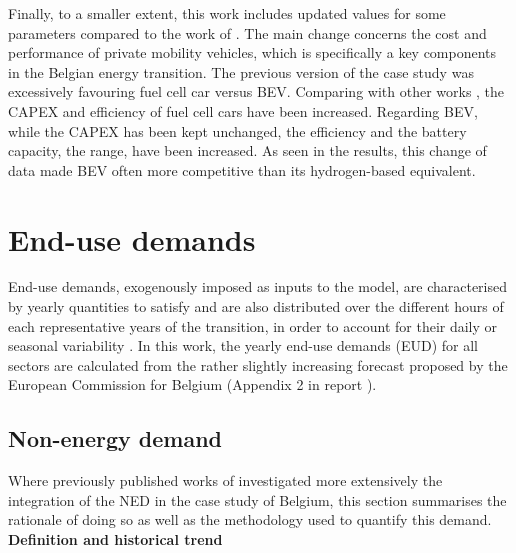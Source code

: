 Finally, to a smaller extent, this work includes updated values for some parameters compared to the work of \citet{limpens2021generating}. The main change concerns the cost and performance of private mobility vehicles, which is specifically a key components in the Belgian energy transition. The previous version of the case study was excessively favouring fuel cell car versus \gls{BEV}. Comparing with other works \cite{schnidrig2021modelling, EuropeanCommission2021}, the CAPEX and efficiency of fuel cell cars have been increased. Regarding \gls{BEV}, while the CAPEX has been kept unchanged, the efficiency and the battery capacity, \ie the range, have been increased. As seen in the results, this change of data made \gls{BEV} often more competitive than its hydrogen-based equivalent. 

\section{End-use demands}
\label{sec:cs:demand}
End-use demands, exogenously imposed as inputs to the model, are characterised by yearly quantities to satisfy and are also distributed over the different hours of each representative years of the transition, in order to account for their daily or seasonal variability \cite{Limpens2020,limpens2021generating}. In this work, the yearly end-use demands (EUD) for all sectors are calculated from the rather slightly increasing forecast proposed by the European Commission for Belgium (Appendix 2 in report \cite{EuropeanCommission2021}). 

\subsection{Non-energy demand}
\label{subsec:cs:NED}
Where previously published works of \citet{rixhon2021comprehensive,rixhon2022integration} investigated more extensively the integration of the \gls{NED} in the case study of Belgium, this section summarises the rationale of doing so as well as the methodology used to quantify this demand.\\

\vspace{0.2cm}\textbf{Definition and historical trend}\vspace{-0.3cm}\\

